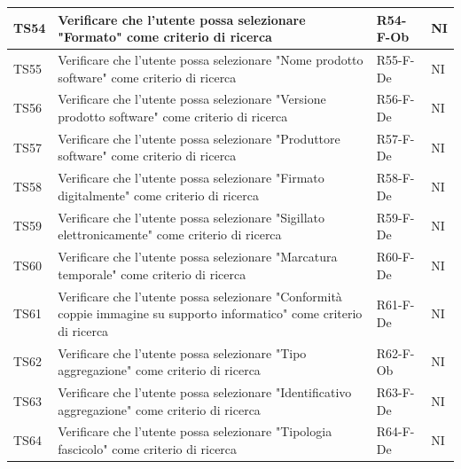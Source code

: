 \documentclass[a4paper,12pt]{article}
\begin{document}
\begin{longtable}{|M{1.2cm}|M{6.3cm}|M{2.5cm}|M{1.5cm}|}
                TS54 & Verificare che l'utente possa selezionare "Formato" come criterio di ricerca & R54-F-Ob & NI \\
                \hline

                TS55 & Verificare che l'utente possa selezionare "Nome prodotto software" come criterio di ricerca & R55-F-De & NI \\
                \hline

                TS56 & Verificare che l'utente possa selezionare "Versione prodotto software" come criterio di ricerca & R56-F-De & NI \\
                \hline

                TS57 & Verificare che l'utente possa selezionare "Produttore software" come criterio di ricerca & R57-F-De & NI \\
                \hline

                TS58 & Verificare che l'utente possa selezionare "Firmato digitalmente" come criterio di ricerca & R58-F-De & NI \\
                \hline

                TS59 & Verificare che l'utente possa selezionare "Sigillato elettronicamente" come criterio di ricerca & R59-F-De & NI \\
                \hline

                TS60 & Verificare che l'utente possa selezionare "Marcatura temporale" come criterio di ricerca & R60-F-De & NI \\
                \hline

                TS61 & Verificare che l'utente possa selezionare "Conformità coppie immagine su supporto informatico" come criterio di ricerca & R61-F-De & NI \\
                \hline

                TS62 & Verificare che l'utente possa selezionare "Tipo aggregazione" come criterio di ricerca & R62-F-Ob & NI \\
                \hline

                TS63 & Verificare che l'utente possa selezionare "Identificativo aggregazione" come criterio di ricerca & R63-F-De & NI \\
                \hline

                TS64 & Verificare che l'utente possa selezionare "Tipologia fascicolo" come criterio di ricerca & R64-F-De & NI \\
                \hline


\end{longtable}
\end{document}
